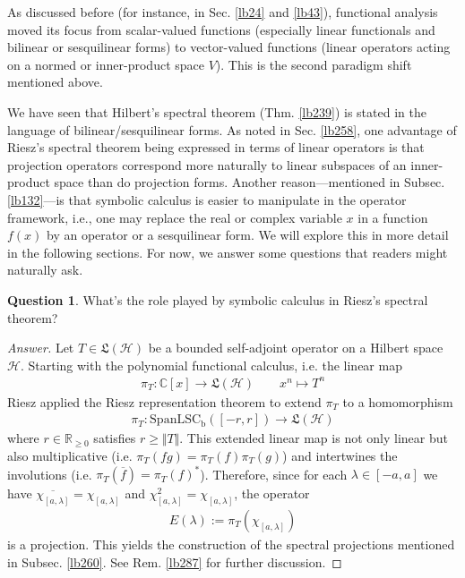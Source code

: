 \documentclass[12pt,b5paper,notitlepage]{article}
\theoremstyle{definition}
\newtheorem{question}[df]{Question}
\theoremstyle{plain}
\newcommand{\fk}{\mathfrak}
\newcommand{\ovl}{\overline}
\newcommand{\Span}{\mathrm{Span}}
\newcommand{\Cbb}{\mathbb C}
\newcommand{\Rbb}{\mathbb R}
\newcommand{\LSCb}{\mathrm{LSC}_{\mathrm b}}
\newcommand{\MH}{\mathcal H}
\numberwithin{equation}{section}
\begin{document}
As discussed before (for instance, in Sec. \ref{lb24} and \ref{lb43}), functional analysis moved its focus from scalar-valued functions (especially linear functionals and bilinear or sesquilinear forms) to vector-valued functions (linear operators acting on a normed or inner-product space $V$). This is the second paradigm shift mentioned above.



We have seen that Hilbert's spectral theorem (Thm. \ref{lb239}) is stated in the language of bilinear/sesquilinear forms. As noted in Sec. \ref{lb258}, one advantage of Riesz's spectral theorem being expressed in terms of linear operators is that projection operators correspond more naturally to linear subspaces of an inner-product space than do projection forms. Another reason---mentioned in Subsec. \ref{lb132}---is that symbolic calculus is easier to manipulate in the operator framework, i.e., one may replace the real or complex variable $x$ in a function $f(x)$ by an operator or a sesquilinear form. We will explore this in more detail in the following sections. For now, we answer some questions that readers might naturally ask.


\begin{question}\label{lb286}
What's the role played by symbolic calculus in Riesz's spectral theorem?
\end{question}

\begin{proof}[Answer]
Let $T\in\fk L(\MH)$ be a bounded self-adjoint operator on a Hilbert space $\MH$. Starting with the polynomial functional calculus, i.e. the linear map
\begin{align*}
\pi_T:\Cbb[x]\rightarrow \fk L(\MH)\qquad x^n\mapsto T^n
\end{align*}
Riesz applied the Riesz representation theorem to extend $\pi_T$ to a homomorphism
\begin{align*}
\pi_T:\Span\LSCb([-r,r])\rightarrow \fk L(\MH)
\end{align*}
where $r\in\Rbb_{\geq0}$ satisfies $r\geq\Vert T\Vert$. This extended linear map is not only linear but also multiplicative (i.e. $\pi_T(fg)=\pi_T(f)\pi_T(g)$) and intertwines the involutions (i.e. $\pi_T(\ovl f)=\pi_T(f)^*$). Therefore, since for each $\lambda\in[-a,a]$ we have $\ovl{\chi_{[a,\lambda]}}=\chi_{[a,\lambda]}$ and $\chi_{[a,\lambda]}^2=\chi_{[a,\lambda]}$, the operator
\begin{align*}
E(\lambda):=\pi_T(\chi_{[a,\lambda]})
\end{align*}
is a projection. This yields the construction of the spectral projections mentioned in Subsec. \ref{lb260}. See Rem. \ref{lb287} for further discussion.
\end{proof}
\end{document}
